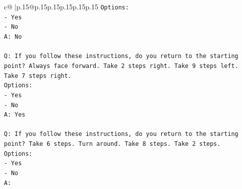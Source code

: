 \documentclass{article}
\begin{document}
{\begin{supertabular}{c@{$\;$}|p{.15\linewidth}@{}p{.15\linewidth}p{.15\linewidth}p{.15\linewidth}p{.15\linewidth}p{.15\linewidth}}
{{{\texttt{Options:} \\
\texttt{{-} Yes} \\
\texttt{{-} No} \\
\texttt{A: No} \\
\\ 
\texttt{Q: If you follow these instructions, do you return to the starting point? Always face forward. Take 2 steps right. Take 9 steps left. Take 7 steps right.} \\
\texttt{Options:} \\
\texttt{{-} Yes} \\
\texttt{{-} No} \\
\texttt{A: Yes} \\
\\ 
\texttt{Q: If you follow these instructions, do you return to the starting point? Take 6 steps. Turn around. Take 8 steps. Take 2 steps.} \\
\texttt{Options:} \\
\texttt{{-} Yes} \\
\texttt{{-} No} \\
\texttt{A:} \\
            }
        }
    }
     \\ \\


\end{supertabular}}
\end{document}
